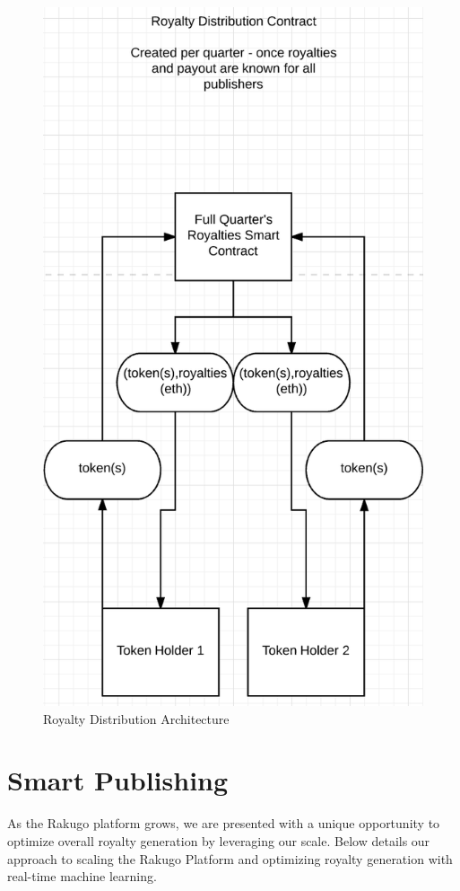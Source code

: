 \documentclass{article}
\begin{document}
\begin{figure}[H]
\centering
\includegraphics[scale=0.65]{royalty_distro.png}
\caption{Royalty Distribution Architecture}
\end{figure}

\section{Smart Publishing}
As the Rakugo platform grows, we are presented with a unique opportunity to optimize overall royalty generation by leveraging our scale. Below details our approach to scaling the Rakugo Platform and optimizing royalty generation with real-time machine learning.
\end{document}

